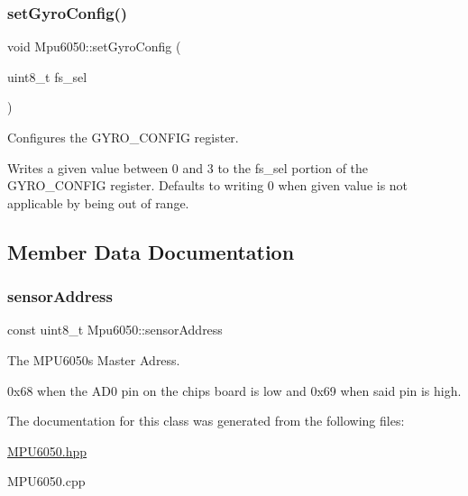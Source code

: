 \subsubsection{\texorpdfstring{set\+Gyro\+Config()}{setGyroConfig()}}
{\footnotesize\ttfamily void Mpu6050\+::set\+Gyro\+Config (\begin{DoxyParamCaption}\item[{uint8\+\_\+t}]{fs\+\_\+sel }\end{DoxyParamCaption})\hspace{0.3cm}{\ttfamily [virtual]}}



Configures the G\+Y\+R\+O\+\_\+\+C\+O\+N\+F\+IG register. 

Writes a given value between 0 and 3 to the fs\+\_\+sel portion of the G\+Y\+R\+O\+\_\+\+C\+O\+N\+F\+IG register. Defaults to writing 0 when given value is not applicable by being out of range. 

\subsection{Member Data Documentation}
\mbox{\label{classMpu6050_ac95dd79bde2892d4a12778f1a436d004}} 
\subsubsection{\texorpdfstring{sensor\+Address}{sensorAddress}}
{\footnotesize\ttfamily const uint8\+\_\+t Mpu6050\+::sensor\+Address\hspace{0.3cm}{\ttfamily [private]}}



The M\+P\+U6050\textquotesingle{}s Master Adress. 

0x68 when the A\+D0 pin on the chip\textquotesingle{}s board is low and 0x69 when said pin is high. 

The documentation for this class was generated from the following files\+:\begin{DoxyCompactItemize}
\item 
\hyperlink{MPU6050_8hpp}{M\+P\+U6050.\+hpp}\item 
M\+P\+U6050.\+cpp\end{DoxyCompactItemize}
